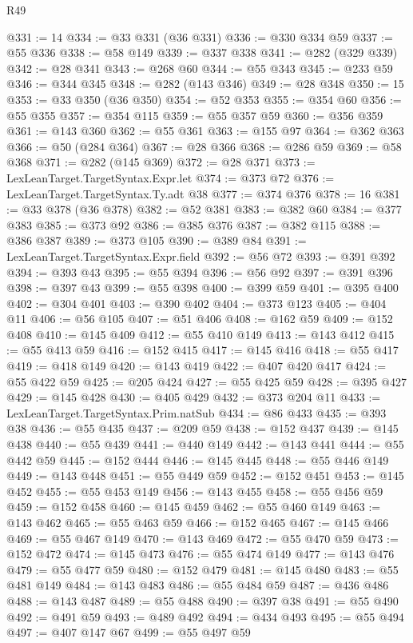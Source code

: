 \begin{lexlean}{R49}
\begin{coremodule}
@331 := 14
@334 := @33 @331 (@36 @331)
@336 := @330 @334 @59
@337 := @55 @336
@338 := @58 @149
@339 := @337 @338
@341 := @282 (@329 @339)
@342 := @28 @341
@343 := @268 @60
@344 := @55 @343
@345 := @233 @59
@346 := @344 @345
@348 := @282 (@143 @346)
@349 := @28 @348
@350 := 15
@353 := @33 @350 (@36 @350)
@354 := @52 @353
@355 := @354 @60
@356 := @55 @355
@357 := @354 @115
@359 := @55 @357 @59
@360 := @356 @359
@361 := @143 @360
@362 := @55 @361
@363 := @155 @97
@364 := @362 @363
@366 := @50 (@284 @364)
@367 := @28 @366
@368 := @286 @59
@369 := @58 @368
@371 := @282 (@145 @369)
@372 := @28 @371
@373 := LexLeanTarget.TargetSyntax.Expr.let
@374 := @373 @72
@376 := LexLeanTarget.TargetSyntax.Ty.adt @38
@377 := @374 @376
@378 := 16
@381 := @33 @378 (@36 @378)
@382 := @52 @381
@383 := @382 @60
@384 := @377 @383
@385 := @373 @92
@386 := @385 @376
@387 := @382 @115
@388 := @386 @387
@389 := @373 @105
@390 := @389 @84
@391 := LexLeanTarget.TargetSyntax.Expr.field
@392 := @56 @72
@393 := @391 @392
@394 := @393 @43
@395 := @55 @394
@396 := @56 @92
@397 := @391 @396
@398 := @397 @43
@399 := @55 @398
@400 := @399 @59
@401 := @395 @400
@402 := @304 @401
@403 := @390 @402
@404 := @373 @123
@405 := @404 @11
@406 := @56 @105
@407 := @51 @406
@408 := @162 @59
@409 := @152 @408
@410 := @145 @409
@412 := @55 @410 @149
@413 := @143 @412
@415 := @55 @413 @59
@416 := @152 @415
@417 := @145 @416
@418 := @55 @417
@419 := @418 @149
@420 := @143 @419
@422 := @407 @420 @417
@424 := @55 @422 @59
@425 := @205 @424
@427 := @55 @425 @59
@428 := @395 @427
@429 := @145 @428
@430 := @405 @429
@432 := @373 @204 @11
@433 := LexLeanTarget.TargetSyntax.Prim.natSub
@434 := @86 @433
@435 := @393 @38
@436 := @55 @435
@437 := @209 @59
@438 := @152 @437
@439 := @145 @438
@440 := @55 @439
@441 := @440 @149
@442 := @143 @441
@444 := @55 @442 @59
@445 := @152 @444
@446 := @145 @445
@448 := @55 @446 @149
@449 := @143 @448
@451 := @55 @449 @59
@452 := @152 @451
@453 := @145 @452
@455 := @55 @453 @149
@456 := @143 @455
@458 := @55 @456 @59
@459 := @152 @458
@460 := @145 @459
@462 := @55 @460 @149
@463 := @143 @462
@465 := @55 @463 @59
@466 := @152 @465
@467 := @145 @466
@469 := @55 @467 @149
@470 := @143 @469
@472 := @55 @470 @59
@473 := @152 @472
@474 := @145 @473
@476 := @55 @474 @149
@477 := @143 @476
@479 := @55 @477 @59
@480 := @152 @479
@481 := @145 @480
@483 := @55 @481 @149
@484 := @143 @483
@486 := @55 @484 @59
@487 := @436 @486
@488 := @143 @487
@489 := @55 @488
@490 := @397 @38
@491 := @55 @490
@492 := @491 @59
@493 := @489 @492
@494 := @434 @493
@495 := @55 @494
@497 := @407 @147 @67
@499 := @55 @497 @59

\end{coremodule}
\end{lexlean}

